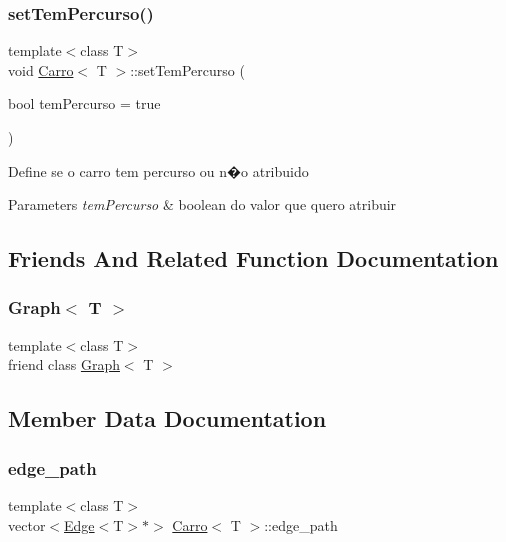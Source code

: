 \subsubsection{\texorpdfstring{set\+Tem\+Percurso()}{setTemPercurso()}}
{\footnotesize\ttfamily template$<$class T$>$ \\
void \mbox{\hyperlink{class_carro}{Carro}}$<$ T $>$\+::set\+Tem\+Percurso (\begin{DoxyParamCaption}\item[{bool}]{tem\+Percurso = {\ttfamily true} }\end{DoxyParamCaption})\hspace{0.3cm}{\ttfamily [inline]}}

Define se o carro tem percurso ou n�o atribuido 
\begin{DoxyParams}{Parameters}
{\em tem\+Percurso} & boolean do valor que quero atribuir \\
\hline
\end{DoxyParams}


\subsection{Friends And Related Function Documentation}
\mbox{\label{class_carro_aefa9b76cd57411c5354e5620dc2d84dd}} 
\subsubsection{\texorpdfstring{Graph$<$ T $>$}{Graph< T >}}
{\footnotesize\ttfamily template$<$class T$>$ \\
friend class \mbox{\hyperlink{class_graph}{Graph}}$<$ T $>$\hspace{0.3cm}{\ttfamily [friend]}}



\subsection{Member Data Documentation}
\mbox{\label{class_carro_a2c552e1d0d83a841c3ce9def21b7956b}} 
\subsubsection{\texorpdfstring{edge\+\_\+path}{edge\_path}}
{\footnotesize\ttfamily template$<$class T$>$ \\
vector$<$\mbox{\hyperlink{class_edge}{Edge}}$<$T$>$$\ast$$>$ \mbox{\hyperlink{class_carro}{Carro}}$<$ T $>$\+::edge\+\_\+path\hspace{0.3cm}{\ttfamily [private]}}

